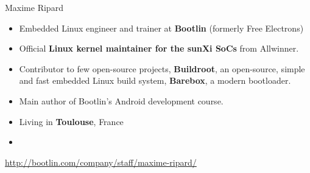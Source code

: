 \begin{frame}{Maxime Ripard}
    \begin{itemize}
	\item Embedded Linux engineer and trainer at {\bf Bootlin}
	      (formerly Free Electrons)
	\item Official {\bf Linux kernel maintainer for the sunXi SoCs}
	      from Allwinner.
	\item Contributor to few open-source projects, {\bf Buildroot}, an
	      open-source, simple and fast embedded Linux build system,
	     {\bf Barebox}, a modern bootloader.
	\item Main author of Bootlin's Android development course.
	\item Living in {\bf Toulouse}, France
	\item {}
    \end{itemize}
    {\small \url{http://bootlin.com/company/staff/maxime-ripard/}}
\end{frame}
